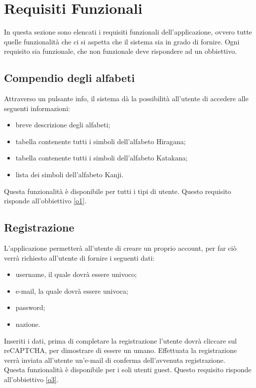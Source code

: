 \section{Requisiti Funzionali}
In questa sezione sono elencati i requisiti funzionali dell'applicazione, ovvero tutte quelle funzionalità che ci si aspetta che il sistema sia in grado di fornire. 
Ogni requisito sia funzionale, che non funzionale deve rispondere ad un obbiettivo.

\subsection{Compendio degli alfabeti} \label{req_compendio}
Attraverso un pulsante info, il sistema dà la possibilità all'utente di accedere alle seguenti informazioni:
\begin{itemize}
    \item breve descrizione degli alfabeti;
    \item tabella contenente tutti i simboli dell'alfabeto Hiragana;
    \item tabella contenente tutti i simboli dell'alfabeto Katakana;
    \item lista dei simboli dell'alfabeto Kanji.
\end{itemize}
Questa funzionalità è disponibile per tutti i tipi di utente. Questo requisito risponde all'obbiettivo \ref{o1}.

\subsection{Registrazione} \label{req_registrazione}
L'applicazione permetterà all'utente di creare un proprio account, per far ciò verrà richiesto all'utente di fornire i seguenti dati:
\begin{itemize}
    \item username, il quale dovrà essere univoco;
    \item e-mail, la quale dovrà essere univoca;
    \item password;
    \item nazione.
\end{itemize}
Inseriti i dati, prima di completare la registrazione l'utente dovrà cliccare sul reCAPTCHA, per dimostrare di essere un umano. Effettuata la registrazione verrà inviata all’utente un’e-mail di conferma dell’avvenuta registrazione. \\
Questa funzionalità è disponibile per i soli utenti guest. Questo requisito risponde all'obbiettivo \ref{o3}.

